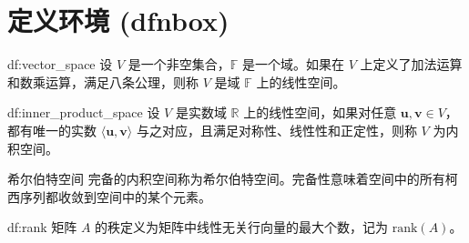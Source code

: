\section{定义环境 (dfnbox)}

\begin{dfnbox}[线性空间]{df:vector_space}
设 \( V \) 是一个非空集合，\( \mathbb{F} \) 是一个域。如果在 \( V \) 上定义了加法运算和数乘运算，满足八条公理，则称 \( V \) 是域 \( \mathbb{F} \) 上的线性空间。
\end{dfnbox}

\begin{dfnbox}[内积空间]{df:inner_product_space}
设 \( V \) 是实数域 \( \mathbb{R} \) 上的线性空间，如果对任意 \( \mathbf{u}, \mathbf{v} \in V \)，都有唯一的实数 \( \langle \mathbf{u}, \mathbf{v} \rangle \) 与之对应，且满足对称性、线性性和正定性，则称 \( V \) 为内积空间。
\end{dfnbox}

\begin{dfnbox*}{希尔伯特空间}
完备的内积空间称为希尔伯特空间。完备性意味着空间中的所有柯西序列都收敛到空间中的某个元素。
\end{dfnbox*}

\begin{dfnbox}[矩阵的秩]{df:rank}
矩阵 \( A \) 的秩定义为矩阵中线性无关行向量的最大个数，记为 \( \text{rank}(A) \)。
\end{dfnbox}